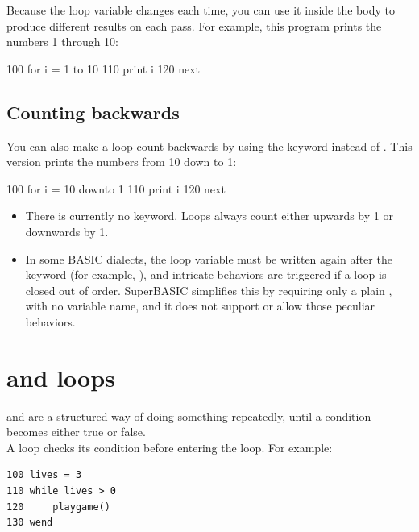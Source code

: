 Because the loop variable changes each time, you can use it inside the body to produce different results on each pass. For example, this program prints the numbers 1 through 10:

\begin{lst}
100 for i = 1 to 10
110   print i
120 next
\end{lst}

\subsection*{Counting backwards}

You can also make a loop count backwards by using the  keyword instead of . This version prints the numbers from 10 down to 1:

\begin{lst}
100 for i = 10 downto 1
110   print i
120 next
\end{lst}

\begin{compatibilitynote}
\begin{itemize}[itemsep=0pt, left=3pt, label=--]
  \item There is currently no  keyword. Loops always count either upwards by 1 or downwards by 1.
  \item In some BASIC dialects, the loop variable must be written again after the  keyword (for example, ), and intricate behaviors are triggered if a loop is closed out of order. SuperBASIC simplifies this by requiring only a plain , with no variable name, and it does not support or allow those peculiar behaviors.
\end{itemize}
\end{compatibilitynote}

\section{ and  loops}

 and  are a structured way of doing something repeatedly, until a condition becomes either true or false.\\

A  loop checks its condition before entering the loop. For example:

\begin{verbatim}
100 lives = 3
110 while lives > 0
120 	playgame()
130 wend
\end{verbatim}

